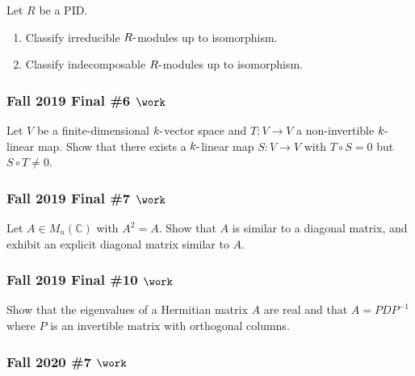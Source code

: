 Let \(R\) be a PID.

\begin{enumerate}
\def\labelenumi{\alph{enumi}.}
\item
  Classify irreducible \(R{\hbox{-}}\)modules up to isomorphism.
\item
  Classify indecomposable \(R{\hbox{-}}\)modules up to isomorphism.
\end{enumerate}

\hypertarget{fall-2019-final-6-work}{%
\subsubsection{\texorpdfstring{Fall 2019 Final \#6
\(\work\)}{Fall 2019 Final \#6 \textbackslash work}}\label{fall-2019-final-6-work}}

Let \(V\) be a finite-dimensional \(k{\hbox{-}}\)vector space and
\(T:V\to V\) a non-invertible \(k{\hbox{-}}\)linear map. Show that there
exists a \(k{\hbox{-}}\)linear map \(S:V\to V\) with \(T\circ S = 0\)
but \(S\circ T\neq 0\).

\hypertarget{fall-2019-final-7-work}{%
\subsubsection{\texorpdfstring{Fall 2019 Final \#7
\(\work\)}{Fall 2019 Final \#7 \textbackslash work}}\label{fall-2019-final-7-work}}

Let \(A\in M_n({\mathbb{C}})\) with \(A^2 = A\). Show that \(A\) is
similar to a diagonal matrix, and exhibit an explicit diagonal matrix
similar to \(A\).

\hypertarget{fall-2019-final-10-work}{%
\subsubsection{\texorpdfstring{Fall 2019 Final \#10
\(\work\)}{Fall 2019 Final \#10 \textbackslash work}}\label{fall-2019-final-10-work}}

Show that the eigenvalues of a Hermitian matrix \(A\) are real and that
\(A = PDP^{-1}\) where \(P\) is an invertible matrix with orthogonal
columns.

\hypertarget{fall-2020-7-work}{%
\subsubsection{\texorpdfstring{Fall 2020 \#7
\(\work\)}{Fall 2020 \#7 \textbackslash work}}\label{fall-2020-7-work}}

